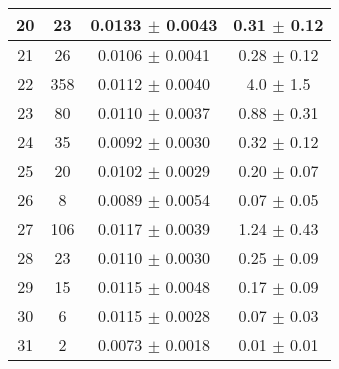 \begin{table}
\begin{tabular}{c|c|c|c}
20 & 23  & 0.0133  $\pm$  0.0043  & 0.31 $\pm$ 0.12    \\\hline
21 & 26  & 0.0106  $\pm$  0.0041  & 0.28 $\pm$ 0.12    \\\hline
22 & 358  & 0.0112  $\pm$  0.0040  & 4.0 $\pm$ 1.5    \\\hline
23 & 80  & 0.0110  $\pm$  0.0037  & 0.88 $\pm$ 0.31    \\\hline
24 & 35  & 0.0092  $\pm$  0.0030  & 0.32 $\pm$ 0.12    \\\hline
25 & 20  & 0.0102  $\pm$  0.0029  & 0.20 $\pm$ 0.07    \\\hline
26 & 8  & 0.0089  $\pm$  0.0054  & 0.07 $\pm$ 0.05    \\\hline
27 & 106  & 0.0117  $\pm$  0.0039  & 1.24 $\pm$ 0.43    \\\hline
28 & 23  & 0.0110  $\pm$  0.0030  & 0.25 $\pm$ 0.09    \\\hline
29 & 15  & 0.0115  $\pm$  0.0048  & 0.17 $\pm$ 0.09    \\\hline
30 & 6  & 0.0115  $\pm$  0.0028  & 0.07 $\pm$ 0.03    \\\hline
31 & 2  & 0.0073  $\pm$  0.0018  & 0.01 $\pm$ 0.01    \\\hline
\end{tabular}
\end{table}

\clearpage
\twocolumn
